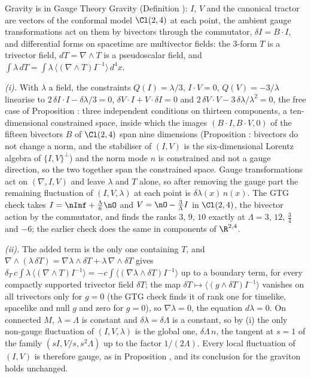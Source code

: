 Gravity is in Gauge Theory Gravity (Definition ): $I$, $V$ and the canonical tractor are vectors of the conformal model $\Cl(2,4)$ at each point, the ambient gauge transformations act on them by bivectors through the commutator, $\delta I = B\cdot I$, and differential forms on spacetime are multivector fields: the $3$-form $T$ is a trivector field, $dT = \nabla\wedge T$ is a pseudoscalar field, and $\int\lambda\,dT = \int\lambda\,\langle(\nabla\wedge T)I^{-1}\rangle\,d^{4}x$.

\emph{(i).} With $\lambda$ a field, the constraints $Q(I) = \lambda/3$, $I\cdot V = 0$, $Q(V) = -3/\lambda$ linearise to $2\,\delta I\cdot I - \delta\lambda/3 = 0$, $\delta V\cdot I + V\cdot\delta I = 0$ and $2\,\delta V\cdot V - 3\,\delta\lambda/\lambda^{2} = 0$, the free case of Proposition : three independent conditions on thirteen components, a ten-dimensional constrained space, inside which the images $(B\cdot I, B\cdot V, 0)$ of the fifteen bivectors $B$ of $\Cl(2,4)$ span nine dimensions (Proposition : bivectors do not change a norm, and the stabiliser of $(I,V)$ is the six-dimensional Lorentz algebra of $\{I,V\}^{\perp}$) and the norm mode $n$ is constrained and not a gauge direction, so the two together span the constrained space. Gauge transformations act on $(\nabla, I, V)$ and leave $\lambda$ and $T$ alone, so after removing the gauge part the remaining fluctuation of $(I, V, \lambda)$ at each point is $\delta\lambda(x)\,n(x)$. The GTG check takes $I = \nInf + \tfrac{\Lambda}{6}\nO$ and $V = \nO - \tfrac{3}{\Lambda}I$ in $\Cl(2,4)$, the bivector action by the commutator, and finds the ranks $3$, $9$, $10$ exactly at $\Lambda = 3$, $12$, $\tfrac34$ and $-6$; the earlier check does the same in components of $\R^{2,4}$.

\emph{(ii).} The added term is the only one containing $T$, and $\nabla\wedge(\lambda\,\delta T) = \nabla\lambda\wedge\delta T + \lambda\,\nabla\wedge\delta T$ gives $\delta_{T}\,c\int\lambda\,\langle(\nabla\wedge T)I^{-1}\rangle = -c\int\langle(\nabla\lambda\wedge\delta T)I^{-1}\rangle$ up to a boundary term, for every compactly supported trivector field $\delta T$; the map $\delta T \mapsto \langle(g\wedge\delta T)I^{-1}\rangle$ vanishes on all trivectors only for $g = 0$ (the GTG check finds it of rank one for timelike, spacelike and null $g$ and zero for $g = 0$), so $\nabla\lambda = 0$, the equation $d\lambda = 0$. On connected $M$, $\lambda = \Lambda$ is constant and $\delta\lambda = \delta\Lambda$ is a constant, so by (i) the only non-gauge fluctuation of $(I, V, \lambda)$ is the global one, $\delta\Lambda\,n$, the tangent at $s = 1$ of the family $(sI, V/s, s^{2}\Lambda)$ up to the factor $1/(2\Lambda)$. Every local fluctuation of $(I, V)$ is therefore gauge, as in Proposition , and its conclusion for the graviton holds unchanged.

